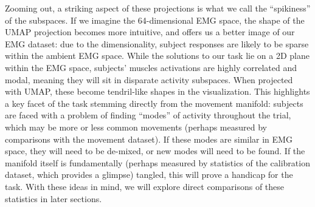 \documentclass[../main.tex]{subfiles}
\begin{document}
Zooming out, a striking aspect of these projections is what we call the ``spikiness'' of the subspaces. If we imagine the 64-dimensional EMG space, the shape of the UMAP projection becomes more intuitive, and offers us a better image of our EMG dataset: due to the dimensionality, subject responses are likely to be sparse within the ambient EMG space. While the solutions to our task lie on a 2D plane within the EMG space, subjects' muscles activations are highly correlated and modal, meaning they will sit in disparate activity subspaces. When projected with UMAP, these become tendril-like shapes in the visualization. This highlights a key facet of the task stemming directly from the movement manifold: subjects are faced with a problem of finding ``modes'' of activity throughout the trial, which may be more or less common movements (perhaps measured by comparisons with the movement dataset). If these modes are similar in EMG space, they will need to be de-mixed, or new modes will need to be found. If the manifold itself is fundamentally (perhaps measured by statistics of the calibration dataset, which provides a glimpse) tangled, this will prove a handicap for the task. With these ideas in mind, we will explore direct comparisons of these statistics in later sections.


\end{document}
